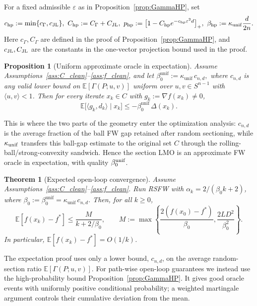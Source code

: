 \documentclass{article}
\newtheorem{theorem}{Theorem}
\newtheorem{proposition}{Proposition}
\begin{document}
For a fixed admissible \(\varepsilon\) as in Proposition~\ref{prop:GammaHP}, set
\begin{equation}\label{eq:hp_constants}
c_{\rm hp}:=\min\{c_\Gamma,c_{\rm JL}\},\ 
C_{\rm hp}:=C_\Gamma+C_{\rm JL},\ 
p_{\rm hp}:=\bigl[1-C_{\rm hp}e^{-c_{\rm hp}\varepsilon^2d}\bigr]_+,\ 
\beta_{\rm hp}:=\kappa_{\rm unif}\frac d{2n}.
\end{equation}
Here \(c_\Gamma,C_\Gamma\) are defined in the proof of Proposition~\ref{prop:GammaHP}, and
\(c_{\rm JL},C_{\rm JL}\) are the constants in the one-vector projection bound
used in the proof.
\begin{proposition}[Uniform approximate oracle in expectation]
\label{prop:approxOracle_global_clean}
Assume Assumptions~\ref{ass:C_clean}--\ref{ass:f_clean}, and let $\beta_0^{\mathrm{unif}}:=\kappa_{\mathrm{unif}}\,c_{n,d},$ where \(c_{n,d}\) is any
valid lower bound on \(\mathbb E[\Gamma(P;u,v)]\) uniform over
\(u,v\in S^{n-1}\) with \(\langle u,v\rangle<1\).
Then for every iterate $x_k\in C$ with $g_k:=\nabla f(x_k)\neq 0$,
\begin{equation}
\mathbb E\big[\langle g_k,d_k\rangle\mid x_k\big]
\le -\beta_0^{\mathrm{unif}}\,\Delta(x_k).
\label{eq:approxOracle_global_clean}
\end{equation}
\end{proposition}
This is where the two parts of the geometry enter the optimization analysis:
\(c_{n,d}\) is the average fraction of the ball FW gap retained after random
sectioning, while \(\kappa_{\rm unif}\) transfers this ball-gap estimate to the
original set \(C\) through the rolling-ball/strong-convexity sandwich. Hence the
section LMO is an approximate FW oracle in expectation, with quality
\(\beta_0^{\rm unif}\).

\begin{theorem}[Expected open-loop convergence]
\label{thm:convergence_clean}
Assume Assumptions~\ref{ass:C_clean}--\ref{ass:f_clean}. Run RSFW with
\(\alpha_k=2/(\beta_0 k+2)\), where
\(\beta_0:=\beta_0^{\mathrm{unif}}=\kappa_{\mathrm{unif}}\,c_{n,d}\). Then, for all \(k\ge0\),
\[
\mathbb E[f(x_k)-f^*]
\le
\frac{M}{k+2/\beta_0},
\qquad
M:=\max\left\{
\frac{2(f(x_0)-f^*)}{\beta_0},
\frac{2LD^2}{\beta_0^2}
\right\}.
\]
In particular, \(\mathbb E[f(x_k)-f^*]=O(1/k)\).
\end{theorem}
The expectation proof uses only a lower bound, $c_{n,d}$, on the average random-section
ratio \(\mathbb{E}[\Gamma(P;u,v)]\). For path-wise open-loop guarantees we instead use the high-probability bound Proposition~\ref{prop:GammaHP}. It gives good oracle events with uniformly positive conditional probability; a weighted martingale argument controls their cumulative deviation from the mean.
\end{document}
